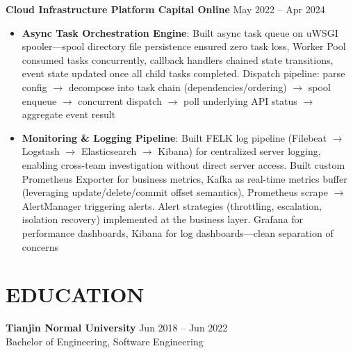 \documentclass[10pt, a4paper]{article}
\newcommand{\entry}[2]{
  \vspace{0.4em}
  \noindent\textbf{#1} \hfill \small #2
  \vspace{0.15em}\newline
}
\begin{document}
\vspace{0.3em}

\entry{Cloud Infrastructure Platform \textbar{} Capital Online}{May 2022 -- Apr 2024}
\begin{itemize}
  \item \textbf{Async Task Orchestration Engine}: Built async task queue on uWSGI spooler---spool directory file persistence ensured zero task loss, Worker Pool consumed tasks concurrently, callback handlers chained state transitions, event state updated once all child tasks completed. Dispatch pipeline: parse config $\to$ decompose into task chain (dependencies/ordering) $\to$ spool enqueue $\to$ concurrent dispatch $\to$ poll underlying API status $\to$ aggregate event result

  \item \textbf{Monitoring \& Logging Pipeline}: Built FELK log pipeline (Filebeat $\to$ Logstash $\to$ Elasticsearch $\to$ Kibana) for centralized server logging, enabling cross-team investigation without direct server access. Built custom Prometheus Exporter for business metrics, Kafka as real-time metrics buffer (leveraging update/delete/commit offset semantics), Prometheus scrape $\to$ AlertManager triggering alerts. Alert strategies (throttling, escalation, isolation recovery) implemented at the business layer. Grafana for performance dashboards, Kibana for log dashboards---clean separation of concerns
\end{itemize}

\section{EDUCATION}

\noindent\textbf{Tianjin Normal University} \hfill Jun 2018 -- Jun 2022\\
Bachelor of Engineering, Software Engineering
\end{document}
